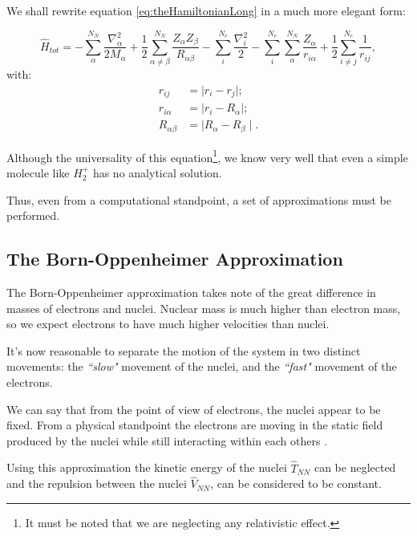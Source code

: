 \documentclass[a4paper,12pt]{article}
\begin{document}
We shall rewrite equation \eqref{eq:theHamiltonianLong} in a much more elegant form:


\begin{equation}\label{eq:theHamiltonian}
\boxed{
	\hat{H}_{tot}   = - \sum_{\alpha}^{N_N} \frac{\nabla^2_{\alpha}}{2M_{\alpha}}
					+ \frac{1}{2}\sum_{\alpha \neq \beta}^{N_N} \frac{Z_{\alpha} Z_{\beta}} {R_{\alpha \beta}}
					- \sum_{i}^{N_e} \frac{\nabla_{i}^2}{2}
					- \sum_{i}^{N_e} \sum_{\alpha}^{N_N} \frac{ Z_{\alpha} }{r_{i \alpha}}				
					+ \frac{1}{2} \sum_{i \neq j}^{N_e} \frac{1}{r_{ij}}
,}
\end{equation}
with:
\begin{align*}
	r_{ij} & = \mid r_{i} - r_{j} \mid ;
\\
	r_{i \alpha} & = \mid r_{i} - R_{\alpha} \mid ;
\\
	R_{\alpha \beta} & = \mid R_{\alpha} - R_{\beta} \mid .
\end{align*}

Although the universality of this equation\footnote{It must be noted that we are neglecting any relativistic effect.}, we know very well that even a simple molecule like $H_2^{+}$ has no analytical solution.

Thus, even from a computational standpoint, a set of approximations must be performed.


\subsection{The Born-Oppenheimer Approximation}

The Born-Oppenheimer approximation takes note of the great difference in masses of electrons and nuclei.
Nuclear mass is much higher than electron mass, so we expect electrons to have much higher velocities than	 nuclei. 

It's now reasonable to separate the motion of the system in two distinct movements: the \textit{``slow"} movement of the nuclei, and the \textit{``fast"} movement of the electrons.

We can say that from the point of view of electrons, the nuclei appear to be fixed. 
From a physical standpoint the electrons are moving in the static field produced by the nuclei while still interacting within each others \cite[p.241]{Atkins}.


Using this approximation the kinetic energy of the nuclei $\hat{T}_{NN}$ can be neglected and the repulsion between the nuclei $\hat{V}_{NN}$, can be considered to be constant.
\end{document}
